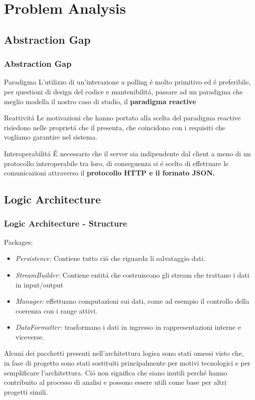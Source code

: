 \documentclass{beamer}
\begin{document}
\section{Problem Analysis}

\subsection{Abstraction Gap}

\begin{frame}
  \frametitle{Abstraction Gap}
  \begin{block}{Paradigma}
    L'utilizzo di un'interazione a polling \'e molto primitivo ed \'e preferibile, per questioni di design del codice e mantenibilit\'a, passare ad un paradigma che meglio modella il nostro caso di studio, il \textbf{paradigma reactive}
  \end{block}
  \begin{block}{Reattivit\'a}
    Le motivazioni che hanno portato alla scelta del paradigma reactive risiedono nelle propriet\'a che il \cite{reactiveManifesto} presenta, che coincidono con i requisiti che vogliamo garantire nel sistema.
  \end{block}
  \begin{block}{Interoperabilit\'a}
    \'E necessario che il server sia indipendente dal client a meno di un protocollo interoperabile tra loro, di conseguenza si \'e scelto di effettuare le comunicazioni attraverso il \textbf{protocollo HTTP e il formato JSON.}
  \end{block}
\end{frame}

\subsection{Logic Architecture}

\begin{frame}
  \frametitle{Logic Architecture - Structure}
  Packages:
  \begin{itemize}
    \item \textit{Persistence:} Contiene tutto ci\'o che riguarda li salvataggio dati.
    \item \textit{StreamBuilder:} Contiene entit\'a che costruiscono gli stream che trattano i dati in input/output
    \item \textit{Manager:} effettuano computazioni sui dati, come ad esempio il controllo della coerenza con i range attivi.
    \item \textit{DataFormatter:} trasformano i dati in ingresso in rappresentazioni interne e viceverse.
  \end{itemize}
  Alcuni dei pacchetti presenti nell'architettura logica sono stati omessi visto che, in fase di progetto sono stati sostituiti principalmente per motivi tecnologici e per semplificare l'architettura. Ci\'o non significa che siano inutili perch\'e hanno contribuito al processo di analisi e possono essere utili come base per altri progetti simili.
\end{frame}
\end{document}
